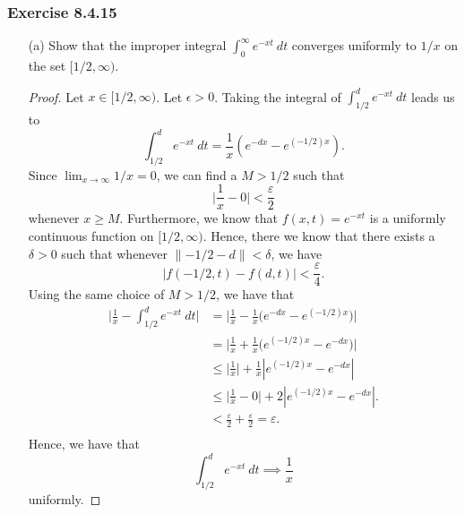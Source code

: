 \subsubsection{Exercise 8.4.15} 
\begin{enumerate}
    \item[(a)] Show that the improper integral \( \int_{ 0 }^{ \infty  }  e^{-xt} \ dt \) converges uniformly to \( 1 /x  \) on the set \( [1/2, \infty ) \). 
        \begin{proof}
            Let \( x \in [1/2, \infty ) \). Let \( \epsilon > 0  \). Taking the integral of \( \int_{ 1/2 }^{ d }  e^{-xt} \  dt \) leads us to 
            \[  \int_{ 1/2 }^{ d }  e^{-xt} \ dt = \frac{ 1 }{ x } ( e^{-dx} - e^{(-1/2)x}). \]
            Since \( \lim_{ x \to \infty  }  1 /x = 0 \), we can find a \( M > 1/2   \) such that 
            \[  \Big| \frac{ 1 }{ x }  - 0  \Big| < \frac{ \varepsilon }{ 2 } \] whenever \( x \geq M  \). Furthermore, we know that  \( f(x,t) = e^{-xt} \) is a uniformly continuous function on \( [1/2, \infty ) \). Hence, there we know that there exists a \( \delta > 0  \) such that whenever \( \lVert -1/2 - d  \rVert < \delta   \), we have
            \[  | f(-1/2,t) - f(d, t)  | < \frac{ \varepsilon }{ 4 }. \]
            Using the same choice of \( M > 1 /2   \), we have that
            \begin{align*}
               \Big| \frac{ 1 }{ x }  - \int_{ 1/2 }^{ d  } e^{-xt} \ dt  \Big|  &= \Big| \frac{ 1 }{ x } - \frac{ 1 }{ x } \Big( e^{-dx} - e^{(-1/2) x} \Big) \Big|  \\
                                                                                 &= \Big| \frac{ 1 }{ x }  + \frac{ 1 }{ x } \Big( e^{(-1/2)x} - e^{-dx} \Big) \Big|  
                                        \\                                         &\leq \Big| \frac{ 1 }{ x }  \Big| + \frac{ 1 }{ x } | e^{(-1/2)x} -  e^{-dx}  | \\
                                                                                   &\leq \Big| \frac{ 1 }{ x } - 0 \Big|  + 2 | e^{(-1/2)x} - e^{-dx}  |. \\
                                                                                   &< \frac{ \varepsilon }{ 2  } + \frac{ \varepsilon }{ 2 }  = \varepsilon. \\
            \end{align*}
            Hence, we have that 
            \[  \int_{ 1/2 }^{ d }  e^{-xt} \ dt \implies \frac{ 1 }{ x  }  \] uniformly.

\end{proof}
\end{enumerate}
